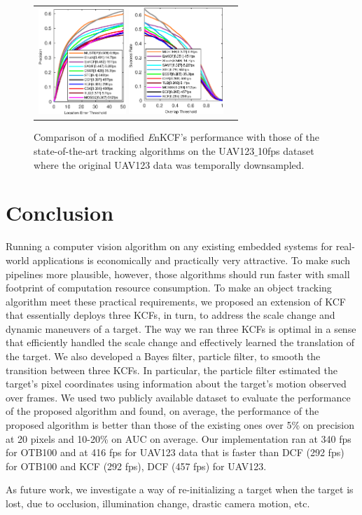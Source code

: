 \documentclass[10pt,twocolumn,letterpaper]{article}
\begin{document}
\begin{figure}[!h]
\centering
\begin{tabular}{cc}
\includegraphics[width=3.30cm]{./figures/pr_uav123_10fps.eps}
\includegraphics[width=3.55cm]{./figures/sr_uav123_10fps.eps}\\
\end{tabular}
\caption{Comparison of a modified {\it E}nKCF's performance with those
  of the state-of-the-art tracking algorithms on the UAV123$\_$10fps
  dataset where the original UAV123 data was temporally downsampled.}
\label{fig:UAV123_10fpsDATASET}
\end{figure}

\section{Conclusion} \label{sc:Conclusion}
Running a computer vision algorithm on any existing embedded systems
for real-world applications is economically and practically very
attractive. To make such pipelines more plausible, however, those
algorithms should run faster with small footprint of computation
resource consumption. To make an object tracking algorithm meet these
practical requirements, we proposed an extension of KCF that
essentially deploys three KCFs, in turn, to address the scale change
and dynamic maneuvers of a target. The way we ran three KCFs is
optimal in a sense that efficiently handled the scale change and
effectively learned the translation of the target. We also developed a
Bayes filter, particle filter, to smooth the transition between three
KCFs. In particular, the particle filter estimated the target's pixel
coordinates using information about the target's motion observed over
frames. We used two publicly available dataset to evaluate the
performance of the proposed algorithm and found, on average, the
performance of the proposed algorithm is better than those of the
existing ones over 5\% on precision at 20 pixels and 10-20\% on AUC on
average. Our implementation ran at 340 fps for OTB100 and at 416 fps
for UAV123 data that is faster than DCF (292 fps) for OTB100 and KCF
(292 fps), DCF (457 fps) for UAV123.

As future work, we investigate a way of re-initializing a target when
the target is lost, due to occlusion, illumination change, drastic
camera motion, etc.

{\small


}
\end{document}
